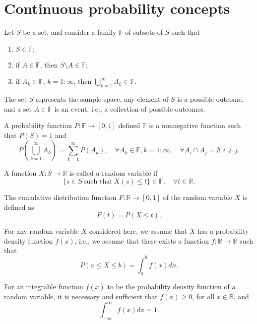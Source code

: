 \section{Continuous probability concepts}
Let $ S $ be a set, and consider a family $ \mathbb{F} $ of subsets of $ S $
    such that
\begin{enumerate}
    \item $ S \in \mathbb{F}; $
    \item if $ A \in \mathbb{F} $, then $ S \setminus A \in \mathbb{F} $;
    \item if $ A_k \in \mathbb{F} $, $ k=1:\infty $, then
        $ \bigcup_{k=1}^{\infty} A_k \in \mathbb{F} $.
\end{enumerate}

The set $ S $ represents the sample space, any element of $ S $ is a possible
    outcome, and a set $ A \in \mathbb{F} $ is an event, i.e., a collection of
    possible outcomes.

A probability function $ P : \mathbb{F} \rightarrow [0, 1] $ defined
    $ \mathbb{F} $ is a nonnegative function such that $ P(S) = 1 $ and
\begin{equation*}
    P \left( \bigcup_{k=1}^{\infty} A_k \right) = \sum_{k=1}^{\infty} P(A_k),
        \quad \forall A_k \in \mathbb{F}, k = 1 : \infty,
        \quad \forall A_i \cap A_j = \emptyset, i \neq j.
\end{equation*}

A function $ X : S \rightarrow \mathbb{R} $ is called a random variable if
\begin{equation*}
    \{ s \in S\ \text{such that}\ X(s) \leq t \} \in \mathbb{F}, \quad
        \forall t \in \mathbb{R}.
\end{equation*}

The cumulative distribution function $ F : \mathbb{R} \rightarrow [0, 1] $ of
    the random variable $ X $ is defined as
\begin{equation}
    F(t) = P(X \leq t).
\end{equation}

For any random variable $ X $ considered here, we assume that $ X $ has a
    probability density function $ f(x) $, i.e., we assume that there exists a
    function $ f : \mathbb{R} \rightarrow \mathbb{R} $ such that
\begin{equation}
    P(a \leq X \leq b) = \int_{a}^{b} f(x) dx.
\end{equation}

For an integrable function $ f(x) $ to be the probability density function of a
    random variable, it is necessary and sufficient that $ f(x) \geq 0 $, for
    all $ x \in \mathbb{R} $, and
\begin{equation}
    \int_{-\infty}^{\infty} f(x) dx = 1.
\end{equation}

